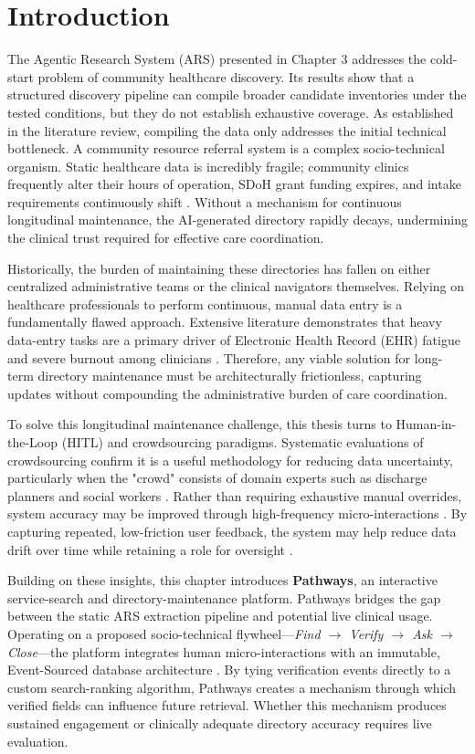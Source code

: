 \documentclass[12pt,oneside]{report}
\begin{document}
\section{Introduction}

The Agentic Research System (ARS) presented in Chapter 3 addresses the cold-start problem of community healthcare discovery. Its results show that a structured discovery pipeline can compile broader candidate inventories under the tested conditions, but they do not establish exhaustive coverage. As established in the literature review, compiling the data only addresses the initial technical bottleneck. A community resource referral system is a complex socio-technical organism. Static healthcare data is incredibly fragile; community clinics frequently alter their hours of operation, SDoH grant funding expires, and intake requirements continuously shift \cite{44, 45, 46}. Without a mechanism for continuous longitudinal maintenance, the AI-generated directory rapidly decays, undermining the clinical trust required for effective care coordination.

Historically, the burden of maintaining these directories has fallen on either centralized administrative teams or the clinical navigators themselves. Relying on healthcare professionals to perform continuous, manual data entry is a fundamentally flawed approach. Extensive literature demonstrates that heavy data-entry tasks are a primary driver of Electronic Health Record (EHR) fatigue and severe burnout among clinicians \cite{53}. Therefore, any viable solution for long-term directory maintenance must be architecturally frictionless, capturing updates without compounding the administrative burden of care coordination.

To solve this longitudinal maintenance challenge, this thesis turns to Human-in-the-Loop (HITL) and crowdsourcing paradigms. Systematic evaluations of crowdsourcing confirm it is a useful methodology for reducing data uncertainty, particularly when the "crowd" consists of domain experts such as discharge planners and social workers \cite{50}. Rather than requiring exhaustive manual overrides, system accuracy may be improved through high-frequency micro-interactions \cite{49, 51}. By capturing repeated, low-friction user feedback, the system may help reduce data drift over time while retaining a role for oversight \cite{54}.

Building on these insights, this chapter introduces \textbf{Pathways}, an interactive service-search and directory-maintenance platform. Pathways bridges the gap between the static ARS extraction pipeline and potential live clinical usage. Operating on a proposed socio-technical flywheel—\textit{Find $\rightarrow$ Verify $\rightarrow$ Ask $\rightarrow$ Close}—the platform integrates human micro-interactions with an immutable, Event-Sourced database architecture \cite{56, 57}. By tying verification events directly to a custom search-ranking algorithm, Pathways creates a mechanism through which verified fields can influence future retrieval. Whether this mechanism produces sustained engagement or clinically adequate directory accuracy requires live evaluation.
\end{document}
